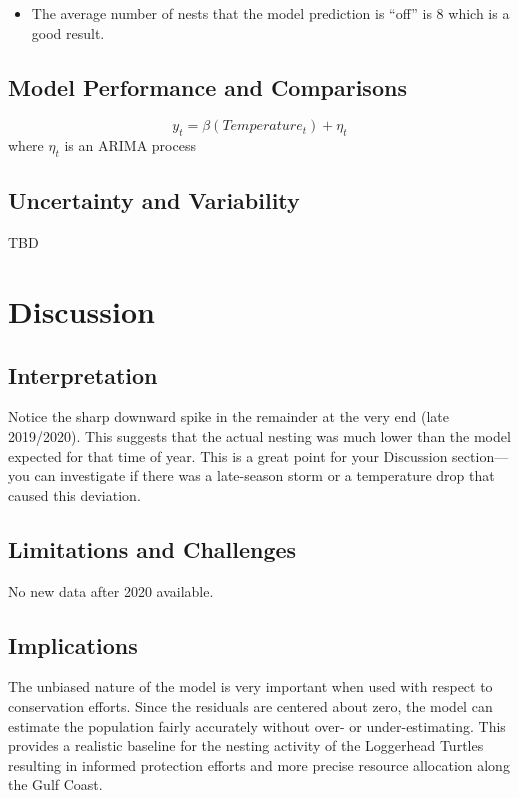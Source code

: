 \documentclass[
  letterpaper,
  DIV=11,
  numbers=noendperiod]{scrartcl}
\providecommand{\tightlist}{%
  \setlength{\itemsep}{0pt}\setlength{\parskip}{0pt}}\usepackage{longtable,booktabs,array}
\begin{document}
\begin{itemize}
\tightlist
\item
  The average number of nests that the model prediction is ``off'' is 8
  which is a good result.
\end{itemize}

\subsection{Model Performance and
Comparisons}\label{model-performance-and-comparisons}

\[
  y_t=\beta(Temperature_t) +\eta_t
\] where \(\eta_t\) is an ARIMA process

\subsection{Uncertainty and
Variability}\label{uncertainty-and-variability}

TBD

\section{Discussion}\label{discussion}

\subsection{Interpretation}\label{interpretation}

Notice the sharp downward spike in the remainder at the very end (late
2019/2020). This suggests that the actual nesting was much lower than
the model expected for that time of year. This is a great point for your
Discussion section---you can investigate if there was a late-season
storm or a temperature drop that caused this deviation.

\subsection{Limitations and
Challenges}\label{limitations-and-challenges}

No new data after 2020 available.

\subsection{Implications}\label{implications}

The unbiased nature of the model is very important when used with
respect to conservation efforts. Since the residuals are centered about
zero, the model can estimate the population fairly accurately without
over- or under-estimating. This provides a realistic baseline for the
nesting activity of the Loggerhead Turtles resulting in informed
protection efforts and more precise resource allocation along the Gulf
Coast.
\end{document}
